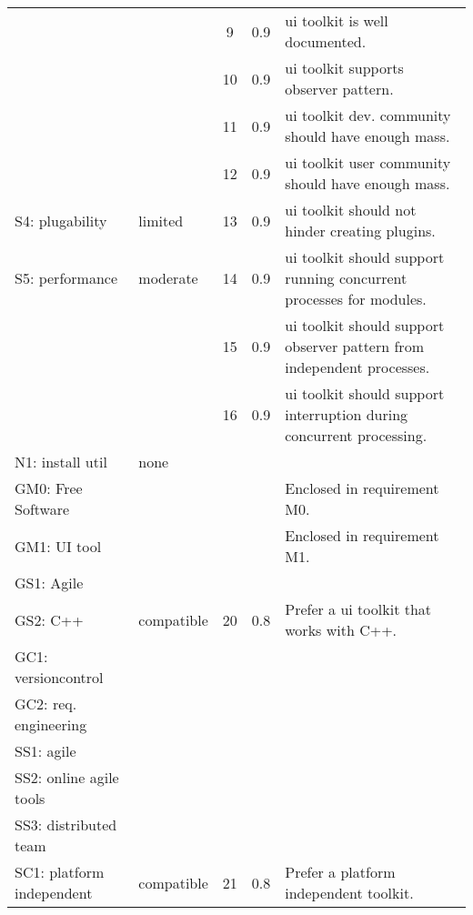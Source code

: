 \begin{center}
\begin{longtable}{ll||ccp{13em}}
	                         &              &  9  & 0.9 & ui toolkit is well documented.\\
	                         &              & 10  & 0.9 & ui toolkit supports observer pattern.\\
	                         &              & 11  & 0.9 & ui toolkit dev. community should have enough mass.\\
	                         &              & 12  & 0.9 & ui toolkit user community should have enough mass.\\
        S4: plugability      & limited      & 13  & 0.9 & ui toolkit should not hinder creating plugins.\\
        S5: performance	     & moderate     & 14  & 0.9 & ui toolkit should support running concurrent processes for modules.\\
	                         &              & 15  & 0.9 & ui toolkit should support observer pattern from independent processes.\\
	                         &              & 16  & 0.9 & ui toolkit should support interruption during concurrent processing.\\
        N1: install util          & none         &     &     & \\\hline
		GM0: Free Software  &              &     &     & Enclosed in requirement M0.\\
        GM1: UI tool	    &              &     &     & Enclosed in requirement M1.\\
        GS1: Agile	        &              &     &     & \\
        GS2: C++	        & compatible   & 20  & 0.8 & Prefer a ui toolkit that works with C++.\\
        GC1: versioncontrol &              &     &     & \\
        GC2: req. engineering
						    &              &     &     & \\\hline
        SS1: agile	        &              &     &     & \\
        SS2: online agile tools
							&              &     &     & \\
        SS3: distributed team
							&              &     &     & \\
        SC1: platform independent
							& compatible	 & 21  & 0.8 & Prefer a platform independent toolkit.\\
    \end{longtable}
    \label{tab:uitool-requirements}
\end{center}
